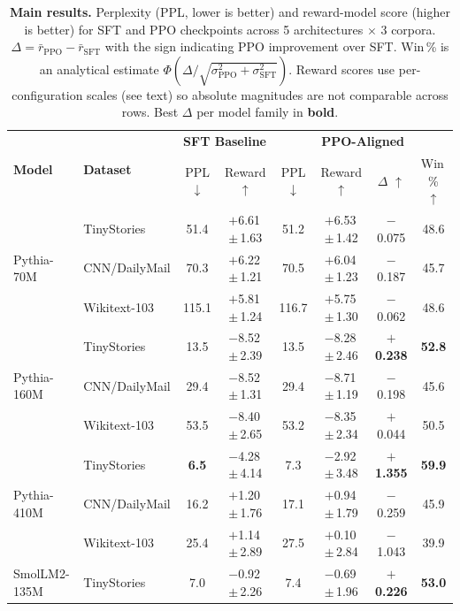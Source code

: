 \documentclass[10pt,twocolumn,letterpaper]{article}
\begin{document}
\begin{table}[t]
\centering
\caption{\textbf{Main results.} Perplexity (PPL, lower is better) and reward-model score (higher is better) for SFT and PPO checkpoints across 5 architectures $\times$ 3 corpora. $\Delta = \bar{r}_\text{PPO} - \bar{r}_\text{SFT}$ with the sign indicating PPO improvement over SFT. Win\,\% is an analytical estimate $\Phi(\Delta/\sqrt{\sigma_\text{PPO}^2 + \sigma_\text{SFT}^2})$. Reward scores use per-configuration scales (see text) so absolute magnitudes are not comparable across rows. Best $\Delta$ per model family in \textbf{bold}.}
\label{tab:main}
\small
\setlength{\tabcolsep}{4pt}
\begin{tabular}{ll|cc|cccc}
\toprule
\multirow{2}{*}{\textbf{Model}} & \multirow{2}{*}{\textbf{Dataset}} &
  \multicolumn{2}{c|}{\textbf{SFT Baseline}} &
  \multicolumn{4}{c}{\textbf{PPO-Aligned}} \\
& & PPL $\downarrow$ & Reward $\uparrow$ & PPL $\downarrow$ & Reward $\uparrow$ & $\Delta$ $\uparrow$ & Win\,\% $\uparrow$ \\
\midrule
\multirow{3}{*}{Pythia-70M}
  & TinyStories   & 51.4  & $+$6.61\,$\pm$\,1.63 & 51.2  & $+$6.53\,$\pm$\,1.42 & $-$0.075 & 48.6 \\
  & CNN/DailyMail & 70.3  & $+$6.22\,$\pm$\,1.21 & 70.5  & $+$6.04\,$\pm$\,1.23 & $-$0.187 & 45.7 \\
  & Wikitext-103  & 115.1 & $+$5.81\,$\pm$\,1.24 & 116.7 & $+$5.75\,$\pm$\,1.30 & $-$0.062 & 48.6 \\
\midrule
\multirow{3}{*}{Pythia-160M}
  & TinyStories   & 13.5  & $-$8.52\,$\pm$\,2.39 & 13.5  & $-$8.28\,$\pm$\,2.46 & \textbf{$+$0.238} & \textbf{52.8} \\
  & CNN/DailyMail & 29.4  & $-$8.52\,$\pm$\,1.31 & 29.4  & $-$8.71\,$\pm$\,1.19 & $-$0.198 & 45.6 \\
  & Wikitext-103  & 53.5  & $-$8.40\,$\pm$\,2.65 & 53.2  & $-$8.35\,$\pm$\,2.34 & $+$0.044 & 50.5 \\
\midrule
\multirow{3}{*}{Pythia-410M}
  & TinyStories   & \textbf{6.5}   & $-$4.28\,$\pm$\,4.14 & 7.3   & $-$2.92\,$\pm$\,3.48 & \textbf{$+$1.355} & \textbf{59.9} \\
  & CNN/DailyMail & 16.2  & $+$1.20\,$\pm$\,1.76 & 17.1  & $+$0.94\,$\pm$\,1.79 & $-$0.259 & 45.9 \\
  & Wikitext-103  & 25.4  & $+$1.14\,$\pm$\,2.89 & 27.5  & $+$0.10\,$\pm$\,2.84 & $-$1.043 & 39.9 \\
\midrule
\multirow{3}{*}{SmolLM2-135M}
  & TinyStories   & 7.0   & $-$0.92\,$\pm$\,2.26 & 7.4   & $-$0.69\,$\pm$\,1.96 & \textbf{$+$0.226} & \textbf{53.0} \\

\end{tabular}
\end{table}
\end{document}
